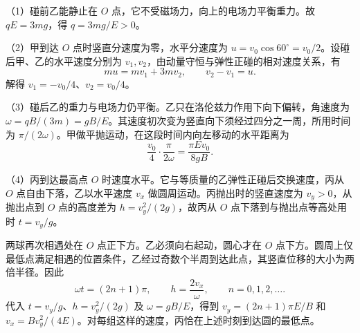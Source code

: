 \documentclass[\gkver]{gaokaozhenti}
\begin{document}
\begin{enumerate}
{（1）碰前乙能静止在 $O$ 点，它不受磁场力，向上的电场力平衡重力。故 $qE=3mg$，得 $q=3mg/E>0$。

（2）甲到达 $O$ 点时竖直分速度为零，水平分速度为 $u=v_0\cos60^\circ=v_0/2$。设碰后甲、乙的水平速度分别为 $v_1,v_2$，由动量守恒与弹性正碰的相对速度关系，有
\[
 mu=mv_1+3mv_2,\qquad v_2-v_1=u.
\]
解得 $v_1=-v_0/4$、$v_2=v_0/4$。

（3）碰后乙的重力与电场力仍平衡。乙只在洛伦兹力作用下向下偏转，角速度为 $\omega=qB/(3m)=gB/E$。其速度初次变为竖直向下须经过四分之一周，所用时间为 $\pi/(2\omega)$。甲做平抛运动，在这段时间内向左移动的水平距离为
\[
 \frac{v_0}{4}\cdot\frac{\pi}{2\omega}=\frac{\pi E v_0}{8gB}.
\]

（4）丙到达最高点 $O$ 时速度水平。它与等质量的乙弹性正碰后交换速度，丙从 $O$ 点自由下落，乙以水平速度 $v_x$ 做圆周运动。丙抛出时的竖直速度为 $v_y>0$，从抛出点到 $O$ 点的高度差为 $h=v_y^2/(2g)$，故丙从 $O$ 点下落到与抛出点等高处用时 $t=v_y/g$。

两球再次相遇处在 $O$ 点正下方。乙必须向右起动，圆心才在 $O$ 点下方。圆周上仅最低点满足相遇的位置条件，乙经过奇数个半周到达此点，其竖直位移的大小为两倍半径。因此
\[
 \omega t=(2n+1)\pi,\qquad h=\frac{2v_x}{\omega},\qquad n=0,1,2,\ldots .
\]
代入 $t=v_y/g$、$h=v_y^2/(2g)$ 及 $\omega=gB/E$，得到 $v_y=(2n+1)\pi E/B$ 和 $v_x=Bv_y^2/(4E)$。对每组这样的速度，丙恰在上述时刻到达圆的最低点。
}

\end{enumerate}
\end{document}
